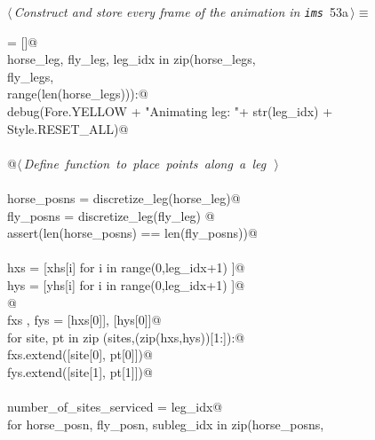 \documentclass[11.5pt]{report}
\begin{document}
\begin{flushleft} \small
\begin{minipage}{\linewidth}\label{scrap85}\raggedright\small
{} $\langle\,${\itshape Construct and store every frame of the animation in \verb|ims|}\nobreak\ {\footnotesize {53a}}$\,\rangle\equiv$
\vspace{-1ex}
\begin{list}{}{} \item
\mbox{}\verb@ims = []@\\
\mbox{}\verb@for horse_leg, fly_leg, leg_idx in zip(horse_legs, \@\\
\mbox{}\verb@                                       fly_legs,   \@\\
\mbox{}\verb@                                       range(len(horse_legs))):@\\
\mbox{}\verb@     debug(Fore.YELLOW + "Animating leg: "+ str(leg_idx) + Style.RESET_ALL)@\\
\mbox{}\verb@@\\
\mbox{}\verb@     @\hbox{$\langle\,${\itshape Define function to place points along a leg}\nobreak\ {\footnotesize {}}$\,\rangle$}\verb@@\\
\mbox{}\verb@@\\
\mbox{}\verb@     horse_posns = discretize_leg(horse_leg)@\\
\mbox{}\verb@     fly_posns   = discretize_leg(fly_leg) @\\
\mbox{}\verb@     assert(len(horse_posns) == len(fly_posns))@\\
\mbox{}\verb@@\\
\mbox{}\verb@     hxs = [xhs[i] for i in range(0,leg_idx+1) ]@\\
\mbox{}\verb@     hys = [yhs[i] for i in range(0,leg_idx+1) ]@\\
\mbox{}\verb@           @\\
\mbox{}\verb@     fxs , fys = [hxs[0]], [hys[0]]@\\
\mbox{}\verb@     for site, pt in zip (sites,(zip(hxs,hys))[1:]):@\\
\mbox{}\verb@          fxs.extend([site[0], pt[0]])@\\
\mbox{}\verb@          fys.extend([site[1], pt[1]])@\\
\mbox{}\verb@@\\
\mbox{}\verb@     number_of_sites_serviced = leg_idx@\\
\mbox{}\verb@     for horse_posn, fly_posn, subleg_idx in zip(horse_posns, \@\\

\end{list}
\end{minipage}
\end{flushleft}
\end{document}
